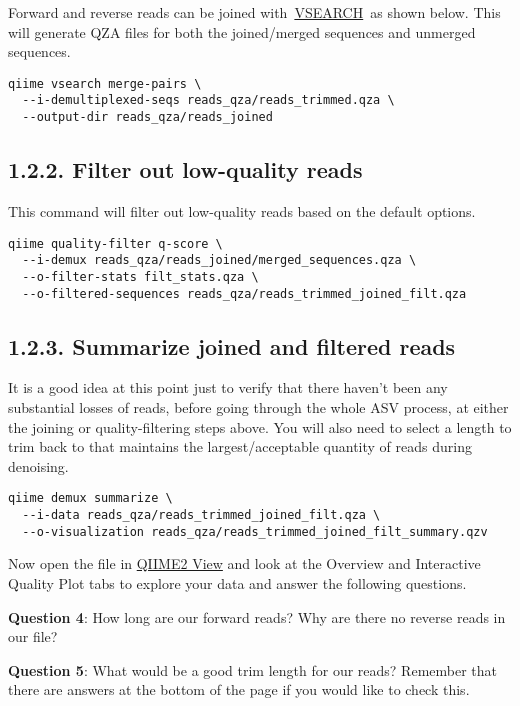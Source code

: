 \documentclass[
]{book}
\begin{document}
Forward and reverse reads can be joined with~\href{https://github.com/torognes/vsearch}{VSEARCH}~as shown below. This will generate QZA files for both the joined/merged sequences and unmerged sequences.

\begin{verbatim}
qiime vsearch merge-pairs \
  --i-demultiplexed-seqs reads_qza/reads_trimmed.qza \
  --output-dir reads_qza/reads_joined
\end{verbatim}

\subsection{1.2.2. Filter out low-quality reads}\label{filter-out-low-quality-reads}

This command will filter out low-quality reads based on the default options.

\begin{verbatim}
qiime quality-filter q-score \
  --i-demux reads_qza/reads_joined/merged_sequences.qza \
  --o-filter-stats filt_stats.qza \
  --o-filtered-sequences reads_qza/reads_trimmed_joined_filt.qza
\end{verbatim}

\subsection{1.2.3. Summarize joined and filtered reads}\label{summarize-joined-and-filtered-reads}

It is a good idea at this point just to verify that there haven't been any substantial losses of reads, before going through the whole ASV process, at either the joining or quality-filtering steps above. You will also need to select a length to trim back to that maintains the largest/acceptable quantity of reads during denoising.

\begin{verbatim}
qiime demux summarize \
  --i-data reads_qza/reads_trimmed_joined_filt.qza \
  --o-visualization reads_qza/reads_trimmed_joined_filt_summary.qzv
\end{verbatim}

Now open the file in \href{https://view.qiime2.org/}{QIIME2 View} and look at the Overview and Interactive Quality Plot tabs to explore your data and answer the following questions.

\textbf{Question 4}: How long are our forward reads? Why are there no reverse reads in our file?

\textbf{Question 5}: What would be a good trim length for our reads? Remember that there are answers at the bottom of the page if you would like to check this.
\end{document}
